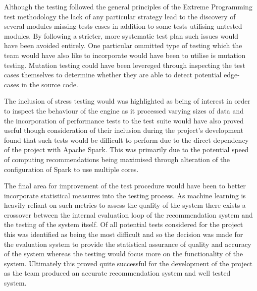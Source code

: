 \documentclass{l3proj}
\begin{document}
Although the testing followed the general principles of the Extreme Programming test methodology the lack of any particular strategy lead to the discovery of several modules missing tests cases in addition to some tests utilising untested modules. By following a stricter, more systematic test plan such issues would have been avoided entirely. One particular ommitted type of testing which the team would have also like to incorporate would have been to utilise is mutation testing. Mutation testing could have been levereged through inspecting the test cases themselves to determine whether they are able to detect potential edge-cases in the source code.

The inclusion of stress testing would was highlighted as being of interest in order to inspect the behaviour of the engine as it processed varying sizes of data and the incorporation of performance tests  to the test suite would have also proved useful though consideration of their inclusion during the project's development found that such tests would be difficult to perform due to the direct dependency of the project with Apache Spark. This was primarily due to the potential speed of computing recommendations being maximised through alteration of the configuration of Spark to use multiple cores.  

The final area for improvement of the test procedure would have been to better incorporate statistical measures into the testing process. As machine learning is heavily reliant on such metrics to assess the quality of the system there exists a crossover between the internal evaluation loop of the recommendation system and the testing of the system itself. Of all potential tests considered for the project this was identified as being the most difficult and so the decision was made for the evaluation system to provide the statistical assurance of quality and accuracy of the system whereas the testing would focus more on the functionality of the system. Ultimately this proved quite successful for the development of the project as the team produced an accurate recommendation system and well tested system.
\end{document}
